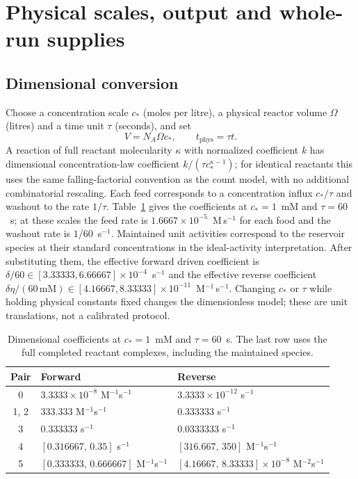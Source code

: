 \documentclass[11pt,a4paper]{article}
\theoremstyle{plain}
\theoremstyle{definition}
\theoremstyle{remark}
\begin{document}
\section{Physical scales, output and whole-run supplies}\label{sec:units}

\subsection{Dimensional conversion}
Choose a concentration scale $c_*$ (moles per litre), a physical reactor volume $\Omega$ (litres) and a time unit $\tau$ (seconds), and set
\begin{equation}\label{eq:units}
 V=N_A\Omega c_*,\qquad t_{\mathrm{phys}}=\tau t .
\end{equation}
A reaction of full reactant molecularity $\kappa$ with normalized coefficient $k$ has dimensional concentration-law coefficient $k/(\tau c_*^{\kappa-1})$; for identical reactants this uses the same falling-factorial convention as the count model, with no additional combinatorial rescaling. Each feed corresponds to a concentration influx $c_*/\tau$ and washout to the rate $1/\tau$. Table~\ref{tab:dim} gives the coefficients at $c_*=1$~mM and $\tau=60$~s; at these scales the feed rate is $1.6667\times10^{-5}$~M\,s$^{-1}$ for each food and the washout rate is $1/60$~s$^{-1}$. Maintained unit activities correspond to the reservoir species at their standard concentrations in the ideal-activity interpretation. After substituting them, the effective forward driven coefficient is $\delta/60\in[3.33333,6.66667]\times10^{-4}$~s$^{-1}$ and the effective reverse coefficient $\delta\eta/(60\,\mathrm{mM})\in[4.16667,8.33333]\times10^{-11}$~M$^{-1}$\,s$^{-1}$. Changing $c_*$ or $\tau$ while holding physical constants fixed changes the dimensionless model; these are unit translations, not a calibrated protocol.

\begin{table}[t]
\centering\small
\caption{Dimensional coefficients at $c_*=1$~mM and $\tau=60$~s. The last row uses the full completed reactant complexes, including the maintained species.}\label{tab:dim}
\begin{tabular}{cll}\toprule
Pair & Forward & Reverse\\\midrule
0 & $3.3333\times10^{-8}$ M$^{-1}$s$^{-1}$ & $3.3333\times10^{-12}$ s$^{-1}$\\
1, 2 & $333.333$ M$^{-1}$s$^{-1}$ & $0.333333$ s$^{-1}$\\
3 & $0.333333$ s$^{-1}$ & $0.0333333$ s$^{-1}$\\
4 & $[0.316667,\,0.35]$ s$^{-1}$ & $[316.667,\,350]$ M$^{-1}$s$^{-1}$\\
5 & $[0.333333,\,0.666667]$ M$^{-1}$s$^{-1}$ & $[4.16667,\,8.33333]\times10^{-8}$ M$^{-2}$s$^{-1}$\\\bottomrule
\end{tabular}
\end{table}
\end{document}
